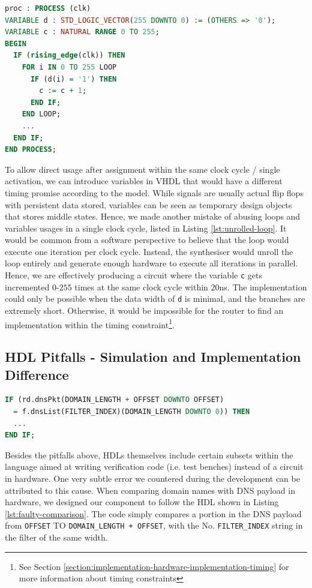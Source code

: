 \documentclass[a4paper]{report}
\newcommand{\proglang}{\textsf}
\newcommand{\code}{\texttt}
\begin{document}
\begin{lstlisting}[language=VHDL, caption=Faulty Unrolled Loop Sample in \proglang{VHDL}, label={lst:unrolled-loop}]
proc : PROCESS (clk)
VARIABLE d : STD_LOGIC_VECTOR(255 DOWNTO 0) := (OTHERS => '0');
VARIABLE c : NATURAL RANGE 0 TO 255;
BEGIN
  IF (rising_edge(clk)) THEN
    FOR i IN 0 TO 255 LOOP
      IF (d(i) = '1') THEN
        c := c + 1;
      END IF;
    END LOOP;
    ... 
  END IF;
END PROCESS;
\end{lstlisting}

To allow direct usage after assignment within the same clock cycle / single activation, we can introduce variables in \proglang{VHDL} that would have a different timing promise according to the model. While signals are usually actual flip flops with persistent data stored, variables can be seen as temporary design objects that stores middle states. Hence, we made another mistake of abusing loops and variables usages in a single clock cycle, listed in Listing \ref{lst:unrolled-loop}. It would be common from a software perspective to believe that the loop would execute one iteration per clock cycle. Instead, the synthesiser would unroll the loop entirely and generate enough hardware to execute all iterations in parallel. Hence, we are effectively producing a circuit where the variable \code{c} gets incremented $0$-$255$ times at the same clock cycle within $20$ns. The implementation could only be possible when the data width of \code{d} is minimal, and the branches are extremely short. Otherwise, it would be impossible for the router to find an implementation within the timing constraint\footnote{See Section \ref{section:implementation-hardware-implementation-timing} for more information about timing constraints}.

\subsection{HDL Pitfalls - Simulation and Implementation Difference}
\label{section:implementation-hardware-debugging-hdl-pitfalls-simulation-and-implementation}

\begin{lstlisting}[language=VHDL, caption=Faulty \code{STD\_LOGIC\_VECTOR} comparison in \proglang{VHDL}, label={lst:faulty-comparison}]
IF (rd.dnsPkt(DOMAIN_LENGTH + OFFSET DOWNTO OFFSET)
  = f.dnsList(FILTER_INDEX)(DOMAIN_LENGTH DOWNTO 0)) THEN
  ...
END IF;
\end{lstlisting}

Besides the pitfalls above, HDLs themselves include certain subsets within the language aimed at writing verification code (i.e. test benches) instead of a circuit in hardware. One very subtle error we countered during the development can be attributed to this cause. When comparing domain names with DNS payload in hardware, we designed our component to follow the HDL shown in Listing \ref{lst:faulty-comparison}. The code simply compares a portion in the DNS payload from \code{OFFSET} TO \code{DOMAIN\_LENGTH + OFFSET}, with the No. \code{FILTER\_INDEX} string in the filter of the same width.
\end{document}
